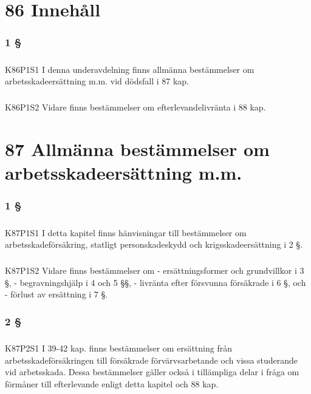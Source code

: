 \documentclass[a4paper,notitlepage,openany,10pt]{book}
\begin{document}
\chapter*{86 Innehåll}
\subsection*{1 §}
\paragraph*{}
{\tiny K86P1S1}
I denna underavdelning finns allmänna bestämmelser om arbetsskadeersättning m.m. vid dödsfall i 87 kap.
\paragraph*{}
{\tiny K86P1S2}
Vidare finns bestämmelser om efterlevandelivränta i 88 kap.
\chapter*{87 Allmänna bestämmelser om arbetsskadeersättning m.m.}
\subsection*{1 §}
\paragraph*{}
{\tiny K87P1S1}
I detta kapitel finns hänvisningar till bestämmelser om arbetsskadeförsäkring, statligt personskadeskydd och krigsskadeersättning i 2 §.
\paragraph*{}
{\tiny K87P1S2}
Vidare finns bestämmelser om
\newline - ersättningsformer och grundvillkor i 3 §,
\newline - begravningshjälp i 4 och 5 §§,
\newline - livränta efter försvunna försäkrade i 6 §, och
\newline - förlust av ersättning i 7 §.
\subsection*{2 §}
\paragraph*{}
{\tiny K87P2S1}
I 39-42 kap. finns bestämmelser om ersättning från arbetsskadeförsäkringen till försäkrade förvärvsarbetande och vissa studerande vid arbetsskada. Dessa bestämmelser gäller också i tillämpliga delar i fråga om förmåner till efterlevande enligt detta kapitel och 88 kap.
\end{document}
